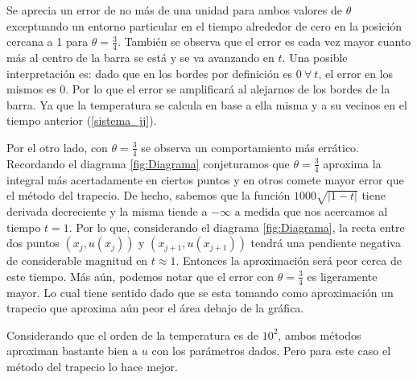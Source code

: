 \documentclass{endm}
\begin{document}
Se aprecia un error de no más de una unidad para ambos valores de $\theta$ exceptuando un entorno particular en el tiempo alrededor de cero en la posición cercana a 1 para $\theta=\frac{3}{4}$. También se observa que el error es cada vez mayor cuanto más al centro de la barra se está y se va avanzando en $t$. Una posible interpretación es: dado que en los bordes por definición es $0 \ \forall \ t$, el error en los mismos es 0. Por lo que el error se amplificará al alejarnos de los bordes de la barra. Ya que la temperatura se calcula en base a ella misma y a su vecinos en el tiempo anterior (\ref{sistema_jj}). \

Por el otro lado, con $\theta=\frac{3}{4}$ se observa un comportamiento más errático. Recordando el diagrama \ref{fig:Diagrama} conjeturamos que $\theta=\frac{3}{4}$ aproxima la integral más acertadamente en ciertos puntos y en otros comete mayor error que el método del trapecio. De hecho, sabemos que la función $1000\sqrt{|1-t|}$ tiene derivada decreciente y la misma tiende a $-\infty$ a medida que nos acercamos al tiempo $t=1$. Por lo que, considerando el diagrama \ref{fig:Diagrama}, la recta entre dos puntos $(x_j,u(x_j))$ y $(x_{j+1},u(x_{j+1}))$ tendrá una pendiente negativa de considerable magnitud en $t\approx1$. Entonces la aproximación será peor cerca de este tiempo. Más aún, podemos notar que el error con $\theta=\frac{3}{4}$ es ligeramente mayor. Lo cual tiene sentido dado que se esta tomando como aproximación un trapecio que aproxima aún peor el área debajo de la gráfica. \

Considerando que el orden de la temperatura es de $10^2$, ambos métodos aproximan bastante bien a $u$ con los parámetros dados. Pero para este caso el método del trapecio lo hace mejor.
\end{document}
